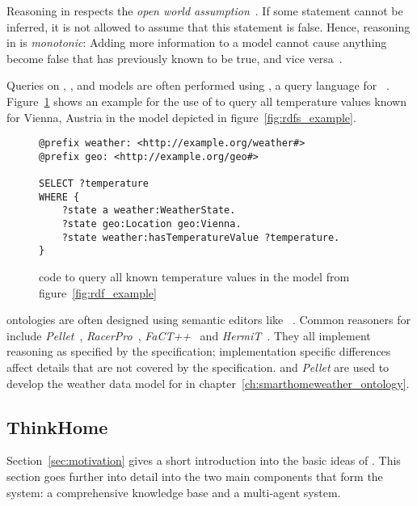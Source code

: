 \begin{itemize}
\end{itemize}

Reasoning in  respects the \emph{open world assumption}~\cite{open_world_assumption1,open_world_assumption2}. If some statement cannot be inferred, it is not allowed to assume that this statement is false. Hence, reasoning in  is \emph{monotonic}: Adding more information to a model cannot cause anything become false that has previously known to be true, and vice versa~\cite{MonotonicReasoning}.

Queries on , , and  models are often performed using , a query language for ~\cite{SPARQL}. Figure~\ref{fig:sparql_example} shows an example for the use of  to query all temperature values known for Vienna, Austria in the  model depicted in figure~\ref{fig:rdfs_example}.

\begin{figure}
\begin{lstlisting}
@prefix weather: <http://example.org/weather#>
@prefix geo: <http://example.org/geo#>

SELECT ?temperature
WHERE {
    ?state a weather:WeatherState.
    ?state geo:Location geo:Vienna.
    ?state weather:hasTemperatureValue ?temperature.
}
\end{lstlisting}
\caption{ code to query all known temperature values in the model from figure~\ref{fig:rdf_example}}
\label{fig:sparql_example}
\end{figure}

 ontologies are often designed using semantic editors like \protege~\cite{protege}. Common reasoners for  include \emph{Pellet}~\cite{pellet}, \emph{RacerPro}~\cite{RacerPro}, \emph{FaCT++}~\cite{factplusplus} and \emph{HermiT}~\cite{hermit}. They all implement reasoning as specified by the  specification; implementation specific differences affect details that are not covered by the  specification. \protege and \emph{Pellet} are used to develop the weather data model for \thinkhome in chapter~\ref{ch:smarthomeweather_ontology}.

\subsection{ThinkHome}

Section~\ref{sec:motivation} gives a short introduction into the basic ideas of \thinkhome. This section goes further into detail into the two main components that form the \thinkhome system: a comprehensive knowledge base and a multi-agent system.

